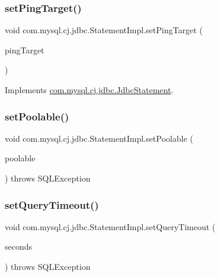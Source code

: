 \subsubsection{\texorpdfstring{set\+Ping\+Target()}{setPingTarget()}}
{\footnotesize\ttfamily void com.\+mysql.\+cj.\+jdbc.\+Statement\+Impl.\+set\+Ping\+Target (\begin{DoxyParamCaption}\item[{\mbox{\hyperlink{interfacecom_1_1mysql_1_1cj_1_1_ping_target}{Ping\+Target}}}]{ping\+Target }\end{DoxyParamCaption})}



Implements \mbox{\hyperlink{interfacecom_1_1mysql_1_1cj_1_1jdbc_1_1_jdbc_statement_a7cf024a169c62cd9acbd867518a82dfc}{com.\+mysql.\+cj.\+jdbc.\+Jdbc\+Statement}}.

\mbox{\label{classcom_1_1mysql_1_1cj_1_1jdbc_1_1_statement_impl_ac5a27f06b5bc99195e039732366a33f5}} 
\subsubsection{\texorpdfstring{set\+Poolable()}{setPoolable()}}
{\footnotesize\ttfamily void com.\+mysql.\+cj.\+jdbc.\+Statement\+Impl.\+set\+Poolable (\begin{DoxyParamCaption}\item[{boolean}]{poolable }\end{DoxyParamCaption}) throws S\+Q\+L\+Exception}

\mbox{\label{classcom_1_1mysql_1_1cj_1_1jdbc_1_1_statement_impl_a4bc4a551083ec1e3a3cabcea2da922ad}} 
\subsubsection{\texorpdfstring{set\+Query\+Timeout()}{setQueryTimeout()}}
{\footnotesize\ttfamily void com.\+mysql.\+cj.\+jdbc.\+Statement\+Impl.\+set\+Query\+Timeout (\begin{DoxyParamCaption}\item[{int}]{seconds }\end{DoxyParamCaption}) throws S\+Q\+L\+Exception}

